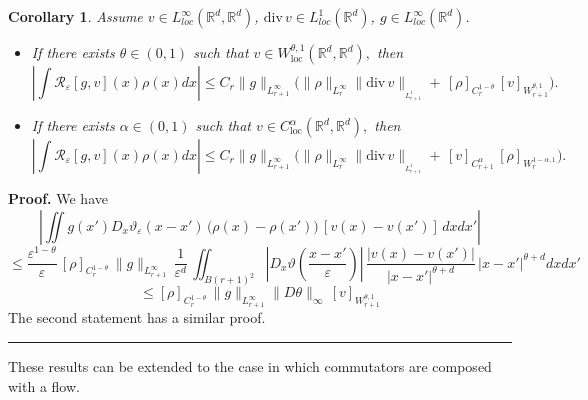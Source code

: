 \documentclass[a4paper,11pt]{article}
\newtheorem{corollary}[theorem]{Corollary}
\newenvironment{proof}[1][Proof]{\textbf{#1.} }{\ \rule{0.5em}{0.5em}}
\newcommand{\loc}{\mathrm{loc}}
\newcommand{\eps}{\varepsilon}
\begin{document}
\begin{corollary} \label{ci4} Assume
  $ v    \in L_{loc}^{\infty}\left(
\mathbb{R}^{d},\mathbb{R}^{d}\right) $, ${\mathrm{div}\,}v\in
L_{loc}^{1}\left(  \mathbb{R}^{d}\right)$, $g    \in
L_{loc}^{\infty}\left(  \mathbb{R}^{d}\right)$.
\begin{itemize}
\item[(i)] If
there exists $\theta  \in (0,1)$ such that
$
  v \in W_{\loc}^{\theta, 1}(
 \mathbb{R}^{d}, \mathbb{R}^{d}),
$
  then %
$$
\left|\int \mathcal{R}_{\varepsilon}\left[  g,v\right] (  x) \rho(x)
dx \right| \le
 C_r \| g\|_{L^{\infty}_{r+1}} \big( \|
\rho\|_{L^{\infty}_{r}}
 \| {\mathrm{div}\,} v
\|_{_{L_{r+1}^{1}}} +  \, [ \rho ]_{C^{1 - \theta}_{r}} \,
 [v]_{W^{\theta,1}_{r+1}} \big).
$$
\item[(ii)] If  there exists $\alpha  \in (0,1)$ such that
$
   v \in C_{\loc}^{\alpha}( \mathbb{R}^{d}, \mathbb{R}^{d}),
$
 then %
$$
\left|\int \mathcal{R}_{\varepsilon}\left[  g,v\right] (  x) \rho(x)
dx \right| \le
 C_r \| g\|_{L^{\infty}_{r+1}} \big( \|
\rho\|_{L^{\infty}_{r}}
 \| {\mathrm{div}\,} v
\|_{_{L_{r+1}^{1}}} +  \, [ v ]_{C^{\alpha}_{r+1}} \,
 [\rho]_{W^{1- \alpha,1}_r} \big).
$$
\end{itemize}
\end{corollary}
 \begin{proof} We have
$$
  \left|
  \iint g(x') D_x \vartheta_{\eps} ({x-x'}) \,
\big( \rho(x) - \rho(x') \big)\, [v(x)-v(x')] \, dx dx' \right|
$$
$$
\le \frac{\eps^{1 - \theta}}{\eps} \, [ \rho ]_{C^{1 -
\theta}_{r}} \,
 \| g \|_{L^{\infty}_{r+1}}\,
  \frac{1}{\eps^{d}}\,
   \iint_{B(r+1)^2} |D_x \vartheta (\frac{x-x'}{\eps})|  \,
  \frac{|v(x)-v(x')|}{|x-x'|^{\theta + d}} \,
  |x-x'|^{ \theta + d}  dx dx'
$$
$$
 \le
  [ \rho ]_{C^{1 - \theta}_{r}}
\,
 \| g \|_{L^{\infty}_{r+1}}
  \| D \theta \|_{\infty}\, [v]_{W^{\theta,1}_{r+1}}
$$
The second statement has a similar proof.
\end{proof}

These results can be extended to the case in which
commutators are composed with  a flow.
\end{document}
